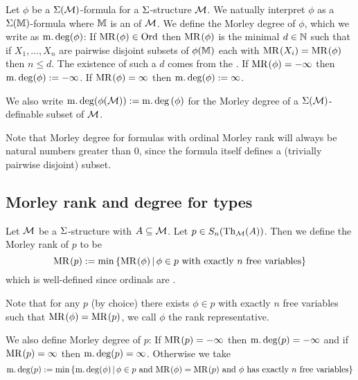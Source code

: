 \begin{dfn}
    Let $\phi$ be a $\Sigma(\mathcal{M})$-formula for a $\Sigma$-structure $\mathcal{M}$.
    We natually interpret $\phi$ as a $\Sigma(\mathbb{M})$-formula
    where $\mathbb{M}$ is an  of $\mathcal{M}$.
    We define the Morley degree of $\phi$, which we write as $\operatorname{m.deg} (\phi)$:
    If $\mathrm{MR}^{}(\phi) \in \operatorname{Ord}$ then
    $\mathrm{MR}^{}(\phi)$ is the minimal $d \in \mathbb{N}$ such that 
    if $X_1,\dots,X_n$ are 
    pairwise disjoint subsets of $\phi(\mathbb{M})$ 
    each with $\mathrm{MR}^{}(X_i) = \mathrm{MR}^{}(\phi)$ then $n \le d$.
    The existence of such a $d$ comes from the .
    If $\mathrm{MR}^{}(\phi) = - \infty$ then $\operatorname{m.deg}(\phi) := -\infty$.
    If $\mathrm{MR}^{}(\phi) = \infty$ then $\operatorname{m.deg}(\phi) := \infty$.

    We also write $\operatorname{m.deg}(\phi(\mathcal{M})):= \operatorname{m.deg}{(\phi)}$ for the Morley degree of 
    a $\Sigma(\mathcal{M})$-definable subset of $\mathcal{M}$.
\end{dfn}
Note that Morley degree for formulas with ordinal Morley rank will always 
be natural numbers greater than $0$, 
since the formula itself defines a (trivially pairwise disjoint) subset.

\subsection{Morley rank and degree for types}
\begin{dfn}
    Let $\mathcal{M}$ be a $\Sigma$-structure with $A \subseteq \mathcal{M}$.
    Let $p \in S_n(\mathrm{Th}_{\mathcal{M}}(A))$.
    Then we define the Morley rank of $p$ to be 
    \[\mathrm{MR}^{}(p) := \min \left\{\mathrm{MR}^{}(\phi) \,|\, \phi \in p 
    \text{ with exactly $n$ free variables}\right\}\]
    which is well-defined since ordinals are 
    .

    Note that for any $p$ (by choice) there exists $\phi \in p$ with exactly $n$ 
    free variables such that $\mathrm{MR}^{}(\phi) = \mathrm{MR}^{}(p)$,
    we call $\phi$ the rank representative.

    We also define Morley degree of $p$:
    If $\mathrm{MR}^{}(p) = -\infty$ then $\operatorname{m.deg}(p) = -\infty$
    and if $\mathrm{MR}^{}(p) = \infty$ then $\operatorname{m.deg}(p) = \infty$.
    Otherwise we take 
    \[
        \operatorname{m.deg}(p) := 
        \min \left\{\operatorname{m.deg}(\phi) \,|\, \phi \in p 
        \text{ and } \mathrm{MR}^{}(\phi) = \mathrm{MR}^{}(p) \text{ and } 
        \phi \text{ has exactly $n$ free variables}\right\}
    \]
\end{dfn}

